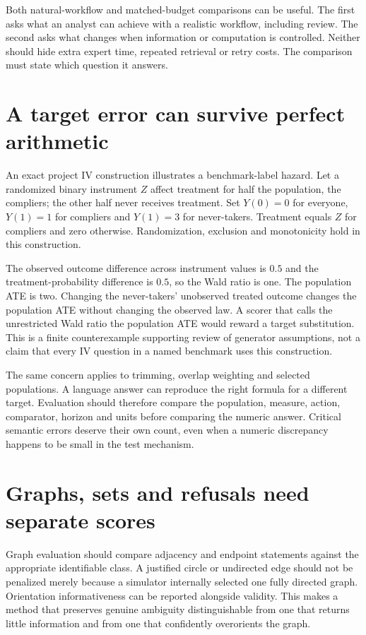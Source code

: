 Both natural-workflow and matched-budget comparisons can be useful. The
first asks what an analyst can achieve with a realistic workflow, including
review. The second asks what changes when information or computation is
controlled. Neither should hide extra expert time, repeated retrieval or
retry costs. The comparison must state which question it answers.

\section{A target error can survive perfect arithmetic}

An exact project IV construction illustrates a benchmark-label hazard.
Let a randomized binary instrument \(Z\) affect treatment for half the
population, the compliers; the other half never receives treatment. Set
\(Y(0)=0\) for everyone, \(Y(1)=1\) for compliers and \(Y(1)=3\) for
never-takers. Treatment equals \(Z\) for compliers and zero otherwise.
Randomization, exclusion and monotonicity hold in this construction.

The observed outcome difference across instrument values is \(0.5\) and
the treatment-probability difference is \(0.5\), so the Wald ratio is one.
The population ATE is two. Changing the never-takers' unobserved treated
outcome changes the population ATE without changing the observed law. A
scorer that calls the unrestricted Wald ratio the population ATE would
reward a target substitution. This is a finite counterexample supporting
review of generator assumptions, not a claim that every IV question in a
named benchmark uses this construction.

The same concern applies to trimming, overlap weighting and selected
populations. A language answer can reproduce the right formula for a
different target. Evaluation should therefore compare the population,
measure, action, comparator, horizon and units before comparing the numeric
answer. Critical semantic errors deserve their own count, even when a
numeric discrepancy happens to be small in the test mechanism.

\section{Graphs, sets and refusals need separate scores}

Graph evaluation should compare adjacency and endpoint statements against
the appropriate identifiable class. A justified circle or undirected edge
should not be penalized merely because a simulator internally selected one
fully directed graph. Orientation informativeness can be reported alongside
validity. This makes a method that preserves genuine ambiguity distinguishable
from one that returns little information and from one that confidently
overorients the graph.

